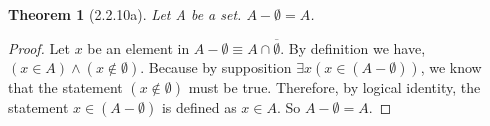 \documentclass[a4paper, 12pt]{article}
\theoremstyle{plain}
\newtheorem*{theorem*}{Theorem}
\begin{document}
	
	\begin{theorem*}[2.2.10a]
		Let A be a set. $A - \emptyset = A$.
	\end{theorem*}
	
	\begin{proof}
		Let $x$ be an element in $A - \emptyset \equiv A \cap \overline{\emptyset}$. By definition we have, 
		\newline $(x \in A) \land (x \notin \emptyset)$. Because by supposition 
		$\exists x (x \in (A - \emptyset))$, we know that the statement $(x \notin \emptyset)$ must be true. 
		Therefore, by logical identity, the statement $x \in (A - \emptyset)$ is defined as $x \in A$. 
		So $A - \emptyset = A.$
	\end{proof}
\end{document}
